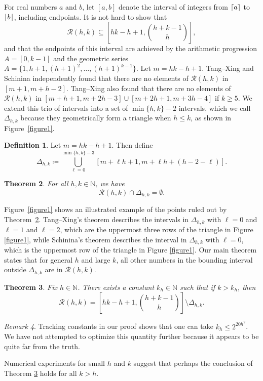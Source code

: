 \documentclass{daj}
\newtheorem{theorem}{Theorem}
\theoremstyle{definition}
\newtheorem{definition}[theorem]{Definition}
\theoremstyle{remark}
\newtheorem{remark}[theorem]{Remark}
\numberwithin{equation}{section}
\numberwithin{theorem}{section}
\newcommand{\N}{\mathbb{N}}
\newcommand{\calr}{\mathcal{R}}
\DeclarePairedDelimiter{\ceil}{\lceil}{\rceil}
\DeclarePairedDelimiter{\floor}{\lfloor}{\rfloor}
\begin{document}
For real numbers $a$ and $b$, let $[a,b]$ denote the interval of integers from $\ceil{a}$ to $\floor{b}$, including endpoints. It is not hard to show \cite[Theorem 1.3]{Nathanson96} that \begin{equation}\label{eqtrivialbound}
    \mathcal{R}(h,k) \subseteq \left[hk-h+1,\binom{h+k-1}{h}\right],
\end{equation} and that the endpoints of this interval are achieved by the arithmetic progression $A = [0,k-1]$ and the geometric series $A = \{1,h+1,(h+1)^2,\ldots,(h+1)^{k-1}\}$.
Let $m = hk-h+1$. Tang--Xing \cite{TX19} and Schinina \cite{Schinina25} independently found that there are no elements of $\mathcal{R}(h,k)$ in $[m+1,m+h-2]$. Tang--Xing also found that there are no elements of $\mathcal{R}(h,k)$ in $[m+h+1,m+2h-3] \cup [m+2h+1,m+3h-4]$ if $k \geq 5$. We extend this trio of intervals into a set of $\min\{h,k\}-2$ intervals, which we call $\Delta_{h,k}$ because they  geometrically form a triangle when $h \leq k$, as shown in Figure~\ref{figure1}.

\begin{definition}\label{defdelta}
    Let $m = hk-h+1$. Then define 
    \[\Delta_{h,k} \coloneq  \bigcup_{\ell =0}^{\min\{h,k\}-3}[m+\ell h+1,m+\ell h+(h-2-\ell)].\]
\end{definition}
\begin{theorem}\label{mainthm} For all $h,k \in \N$, we have
    \[\mathcal{R}(h,k) \cap \Delta_{h,k} = \emptyset.\]
\end{theorem}

Figure~\ref{figure1} shows an illustrated example of the points ruled out by Theorem~\ref{mainthm}. Tang--Xing's \cite{TX19} theorem describes the intervals in $\Delta_{h,k}$ with $\ell = 0$ and $\ell = 1$ and $\ell = 2$, which are the uppermost three rows of the triangle in Figure \ref{figure1}, while Schinina's \cite{Schinina25} theorem describes the interval in $\Delta_{h,k}$ with $\ell = 0$, which is the uppermost row of the triangle in Figure \ref{figure1}. Our main theorem states that for general $h$ and large $k$, all other numbers in the bounding interval outside $\Delta_{h,k}$ are in $\calr(h,k)$.

\begin{theorem}\label{thmgeneralh}
    Fix $h \in \N$. There exists a constant $k_h \in \N$ such that if $k > k_h$, then \[\calr(h,k) = \left[hk-h+1,\binom{h+k-1}{h}\right] \setminus \Delta_{h,k}.\]
\end{theorem}

\begin{remark}\label{remarkasterisk}
Tracking constants in our proof shows that one can take $k_h \leq 2^{20h^2}$. We have not attempted to optimize this quantity further because it appears to be quite far from the truth.
\end{remark}
Numerical experiments for small $h$ and $k$ suggest that perhaps the conclusion of Theorem \ref{thmgeneralh} holds for all $k> h$. 
\end{document}
